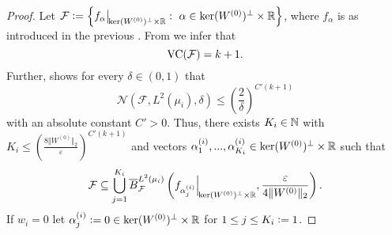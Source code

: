 \begin{proof}
Let $\mathcal{F} \defeq \left\{ \fres{f_\alpha}{\ker(W^{(0)})^\perp \times \RR} : \ \alpha \in \ker(W^{(0)})^\perp \times \RR\right\}$, where $f_\alpha$ is as introduced in the previous . From  we infer that 
\begin{equation*}
\operatorname{VC}(\mathcal{F})  = k+1. 
\end{equation*}
Further,  shows for every $\delta \in (0,1)$ that
\begin{equation*}
\mathcal{N}(\mathcal{F}, L^2(\mu_i), \delta) \leq \left( \frac{2}{\delta}\right)^{C'(k+1)}
\end{equation*}
with an absolute constant $C'>0$. Thus, there exists $K_i \in \mathbb{N}$ with $K_i \leq \left(\frac{8 \Vert W^{(0)} \Vert_2}{\varepsilon}\right)^{C'(k+1)}$ and vectors $\alpha_1^{(i)},..., \alpha_{K_i}^{(i)} \in \ker(W^{(0)})^\perp \times \mathbb{R}$ such that
\begin{equation*}
\mathcal{F} \subseteq \bigcup_{j=1}^{K_i} \overline{B}_\mathcal{F}^{L^2(\mu_i)} \left(\fres{f_{\alpha_j^{(i)}}}{\ker(W^{(0)})^\perp \times \RR},\frac{\epsilon}{4\Vert W^{(0)} \Vert_2}\right).
\end{equation*}
If $w_i=0$ let $\alpha_j^{(i)} \mathrel{\mathop:}= 0 \in \ker(W^{(0)})^\perp \times \mathbb{R}$ for $1\leq j \leq K_i \mathrel{\mathop:}= 1$. 


\end{proof}
